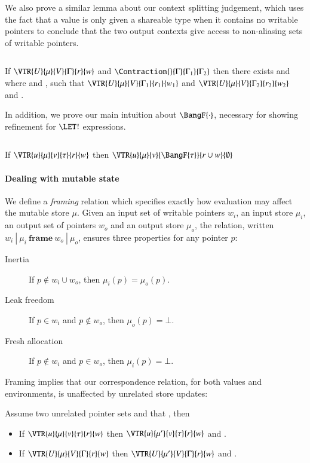 \documentclass[9pt\ifFinal\else,preprint,nocopyrightspace\fi,\ifAlpha\else natbib,authoryear\fi]{sigplanconf}
\begin{document}
\noindent We also prove a similar lemma about our context splitting judgement, which uses the fact that a value is only given a shareable type when it contains no writable pointers to conclude that the two output contexts give access to non-aliasing sets of writable pointers.
\begin{lemma}$\ $

\noindent If $\VTR{U}{\mu}{V}{\Gamma}{r}{w}$ and $\Contraction{}{\Gamma}{\Gamma_1}{\Gamma_2}$ then there exists  and  where  and , such that $\VTR{U}{\mu}{V}{\Gamma_1}{r_1}{w_1}$ and $\VTR{U}{\mu}{V}{\Gamma_2}{r_2}{w_2}$ and .
\end{lemma}

\noindent In addition, we prove our main intuition about $\BangF{\cdot}$, necessary for showing refinement for $\LET!$ expressions.
\begin{lemma}$\ $

\noindent If $\VTR{u}{\mu}{v}{\tau}{r}{w}$ then $\VTR{u}{\mu}{v}{\BangF{\tau}}{r \cup w}{\emptyset}$
\end{lemma}

\newcommand{\Frame}[4]{#1\ |\ #2\ \textbf{frame}\ #3\ |\ #4}
\paragraph{Dealing with mutable state} We define a \emph{framing} relation which specifies exactly how evaluation may affect the mutable store $\mu$. Given an input
set of writable pointers $w_i$, an input store $\mu_i$, an output set of pointers $w_o$ and an output store $\mu_o$, the relation, written $\Frame{w_i}{\mu_i}{w_o}{\mu_o}$, 
ensures three properties for any pointer $p$:
\begin{description}
  \item[Inertia] If $p \notin w_i \cup w_o$, then $\mu_i(p) = \mu_o(p)$.
  \item[Leak freedom] If $p \in w_i$ and $p \notin w_o$, then $\mu_o(p) = \bot$.
  \item[Fresh allocation] If $p \notin w_i$ and $p \in w_o$, then $\mu_i(p) = \bot$.
\end{description}
Framing implies that our correspondence relation, for both values and environments, is unaffected by unrelated store updates:

\begin{lemma} Assume two unrelated pointer sets  and that \HiBlue{\Frame{w_1}{\mu}{w_2}{\mu'}}, then

\begin{itemize}
\item If $\VTR{u}{\mu}{v}{\tau}{r}{w}$  
then $\VTR{u}{\mu'}{v}{\tau}{r}{w}$ and .
\item If $\VTR{U}{\mu}{V}{\Gamma}{r}{w}$ 
then $\VTR{U}{\mu'}{V}{\Gamma}{r}{w}$ and .
\end{itemize}
\end{lemma}
\end{document}
